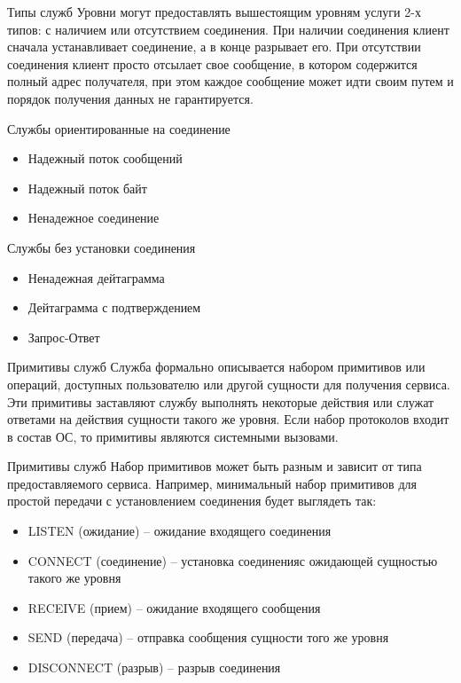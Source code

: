 \begin{frame}{Типы служб}
Уровни  могут предоставлять вышестоящим уровням услуги 2-х типов: с наличием или отсутствием соединения.
При наличии соединения клиент сначала устанавливает соединение,  а в конце разрывает его.
При отсутствии соединения клиент просто отсылает свое сообщение,  в котором содержится полный адрес получателя,  при этом каждое сообщение может идти своим путем и порядок получения данных не гарантируется.
\end{frame}

\begin{frame}{Службы ориентированные на соединение}
	\begin{itemize}
		\item Надежный поток сообщений
		\item Надежный поток байт
		\item Ненадежное соединение
	\end{itemize}
\end{frame}

\begin{frame}{Службы без установки соединения}
	\begin{itemize}
		\item Ненадежная дейтаграмма
		\item Дейтаграмма с подтверждением
		\item Запрос-Ответ
	\end{itemize}
\end{frame}

\begin{frame}{Примитивы служб}
	Служба формально описывается набором примитивов или операций,  доступных пользователю или другой сущности для получения сервиса. Эти примитивы заставляют службу выполнять некоторые действия или служат ответами на действия сущности такого же уровня. Если набор протоколов входит в состав ОС,  то примитивы являются системными вызовами.
\end{frame}

\begin{frame}{Примитивы служб}
	Набор примитивов может быть разным и зависит от типа предоставляемого сервиса. Например,  минимальный набор примитивов для простой передачи с установлением соединения будет выглядеть так:
	\begin{itemize}
		\item LISTEN (ожидание) -- ожидание входящего соединения
		\item CONNECT (соединение) -- установка соединенияс ожидающей сущностью такого же уровня
		\item RECEIVE (прием) -- ожидание входящего сообщения
		\item SEND (передача) -- отправка сообщения сущности того же уровня
		\item DISCONNECT (разрыв) -- разрыв соединения
	\end{itemize}
\end{frame}


